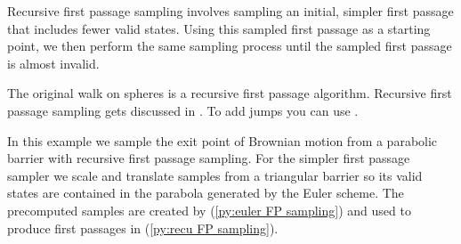 \documentclass[a4paper,12pt]{article}
\begin{document}
\begin{technique}
    Recursive first passage sampling involves sampling an initial,
    simpler first passage that includes fewer valid states. Using
    this sampled first passage as a starting point, we
    then perform the same sampling process until the sampled
    first passage is almost invalid.
\end{technique}

\begin{related}
    The original walk on spheres is a recursive first passage algorithm.
    Recursive first passage sampling gets discussed in \cite{herrmann_first-passage_2016}.
    To add jumps you can use \cite{herrmann_exact_2021}.
\end{related}

\begin{example} \label{ex:recursive first passage sampling}
    In this example we sample the exit point of Brownian motion from a parabolic barrier
    with recursive first passage sampling.
    For the simpler first passage sampler we scale and translate
    samples from a triangular barrier so its
    valid states are contained in the parabola generated
    by the Euler scheme. The precomputed samples are created
    by (\ref{py:euler FP sampling}) and used to produce first passages
    in (\ref{py:recu FP sampling}).

\end{example}

\begin{pythonn} \label{py:euler FP sampling}
\end{pythonn}
\end{document}
